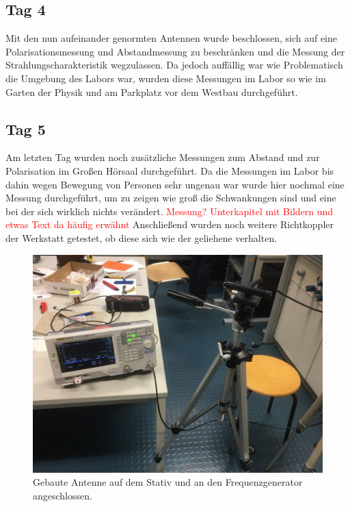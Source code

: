 \documentclass[titlepage,11pt,a4paper,ngerman]{article}
\begin{document}
\subsection{Tag 4}
Mit den nun aufeinander genormten Antennen wurde beschlossen, sich auf eine  Polarisationsmessung und Abstandmessung zu beschränken und die Messung der Strahlungscharakteristik wegzulassen. Da jedoch auffällig war wie Problematisch die Umgebung des Labors war, wurden diese Messungen im Labor so wie im Garten der Physik und am Parkplatz vor dem Westbau durchgeführt.
\subsection{Tag 5}
Am letzten Tag wurden noch zusätzliche Messungen zum Abstand und zur Polarisation im Großen Hörsaal durchgeführt. Da die Messungen im Labor bis dahin wegen Bewegung von Personen sehr ungenau war wurde hier nochmal eine Messung durchgeführt, um zu zeigen wie groß die Schwankungen sind und eine bei der sich wirklich nichts verändert. \textcolor{red}{Messung? Unterkapitel mit Bildern und etwas Text da häufig erwähnt}
Anschließend wurden noch weitere Richtkoppler der Werkstatt getestet, ob diese sich wie der geliehene verhalten.
\begin{figure}[h]
	\includegraphics[scale=0.3]{Bilder/Ant_Fktgen}
	\centering
	\caption{Gebaute Antenne auf dem Stativ und an den Frequenzgenerator angeschlossen.}
\end{figure}
\end{document}
